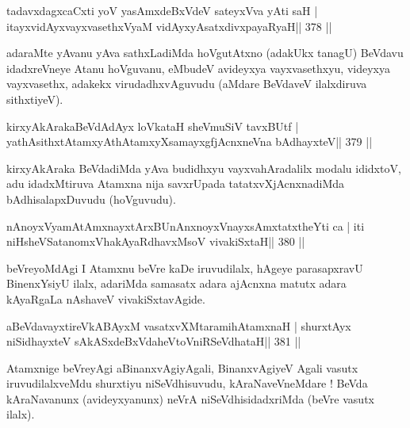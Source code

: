
\begin{shl}
tadavxdagxcaCxti yoV yasAmxdeBxVdeV sateyxVva yAti saH |
itayxvidAyxvayxvasethxVyaM vidAyxyAsatxdivxpayaRyaH\hfill || 378 ||
\end{shl}

\begin{artha}
adaraMte yAvanu yAva sathxLadiMda hoVgutAtxno (adakUkx tanagU) BeVdavu  idadxreVneye Atanu hoVguvanu, eMbudeV avideyxya vayxvasethxyu, videyxya vayxvasethx, adakekx virudadhxvAguvudu (aMdare BeVdaveV ilalxdiruva sithxtiyeV).
\end{artha}

\begin{shl}
kirxyAkArakaBeVdAdAyx loVkataH sheVmuSiV tavxBUtf |
yathAsithxtAtamxyAthAtamxyXsamayxgfjAcnxneVna bAdhayxteV\hfill || 379 ||
\end{shl}

\begin{artha}
kirxyAkAraka BeVdadiMda yAva budidhxyu vayxvahAradalilx modalu  ididxtoV, adu idadxMtiruva Atamxna nija savxrUpada tatatxvXjAcnxnadiMda bAdhisalapxDuvudu (hoVguvudu).
\end{artha}


\begin{shl}
nAnoyxV\s yamAtAmx\s nayxtArxBUnAnxnoyxV\s nayxsAmxtatxtheYti ca |
iti niHsheVSatanomxVhakAyaRdhavxMsoV vivakiSxtaH\hfill || 380 ||
\end{shl}

\begin{artha}
beVreyoMdAgi I Atamxnu beVre kaDe iruvudilalx, hAgeye parasapxravU BinenxYsiyU ilalx, adariMda samasatx adara ajAcnxna matutx adara kAyaRgaLa nAshaveV vivakiSxtavAgide.
\end{artha}

\begin{shl}
aBeVdavayxtireVkABAyxM vasatxvXMtaramihA\s\s tamxnaH |
shurxtAyx niSidhayxteV sAkASxdeBxVdaheVtoVniRSeVdhataH\hfill || 381 ||
\end{shl}

\begin{artha}
Atamxnige beVreyAgi aBinanxvAgiyAgali, BinanxvAgiyeV Agali vasutx  iruvudilalxveMdu shurxtiyu niSeVdhisuvudu, kAraNaveVneMdare ! BeVda kAraNavanunx (avideyxyanunx) neVrA niSeVdhisidadxriMda (beVre vasutx ilalx).
\end{artha}

